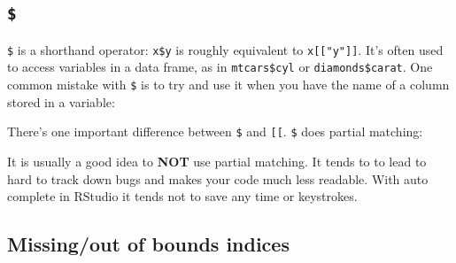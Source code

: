 \documentclass[]{book}
\newenvironment{Shaded}{\begin{snugshade}}{\end{snugshade}}
\newcommand{\CommentTok}[1]{\textcolor[rgb]{0.56,0.35,0.01}{\textit{#1}}}
\newcommand{\DataTypeTok}[1]{\textcolor[rgb]{0.13,0.29,0.53}{#1}}
\newcommand{\DecValTok}[1]{\textcolor[rgb]{0.00,0.00,0.81}{#1}}
\newcommand{\KeywordTok}[1]{\textcolor[rgb]{0.13,0.29,0.53}{\textbf{#1}}}
\newcommand{\NormalTok}[1]{#1}
\newcommand{\OperatorTok}[1]{\textcolor[rgb]{0.81,0.36,0.00}{\textbf{#1}}}
\newcommand{\StringTok}[1]{\textcolor[rgb]{0.31,0.60,0.02}{#1}}
\theoremstyle{definition}
\theoremstyle{definition}
\theoremstyle{definition}
\theoremstyle{remark}
\begin{document}
\hypertarget{section}{%
\subsection{\texorpdfstring{\texttt{\$}}{\$}}\label{section}}

\texttt{\$} is a shorthand operator: \texttt{x\$y} is roughly equivalent
to \texttt{x{[}{[}"y"{]}{]}}. It's often used to access variables in a
data frame, as in \texttt{mtcars\$cyl} or \texttt{diamonds\$carat}. One
common mistake with \texttt{\$} is to try and use it when you have the
name of a column stored in a variable:

\begin{Shaded}
\begin{Highlighting}[]
\NormalTok{var <-}\StringTok{ "cyl"}
\CommentTok{# Doesn't work - mtcars$var translated to mtcars[["var"]]}
\NormalTok{mtcars}\OperatorTok{$}\NormalTok{var}
\CommentTok{#> NULL}

\CommentTok{# Instead use [[}
\NormalTok{mtcars[[var]]}
\CommentTok{#>  [1] 6 6 4 6 8 6 8 4 4 6 6 8 8 8 8 8 8 4 4 4 4 8 8 8 8 4 4 4 8 6 8 4}
\end{Highlighting}
\end{Shaded}

There's one important difference between \texttt{\$} and
\texttt{{[}{[}}. \texttt{\$} does partial matching:

\begin{Shaded}
\end{Shaded}

It is usually a good idea to \textbf{NOT} use partial matching. It tends
to to lead to hard to track down bugs and makes your code much less
readable. With auto complete in RStudio it tends not to save any time or
keystrokes.

\hypertarget{missingout-of-bounds-indices}{%
\subsection{Missing/out of bounds
indices}\label{missingout-of-bounds-indices}}
\end{document}
